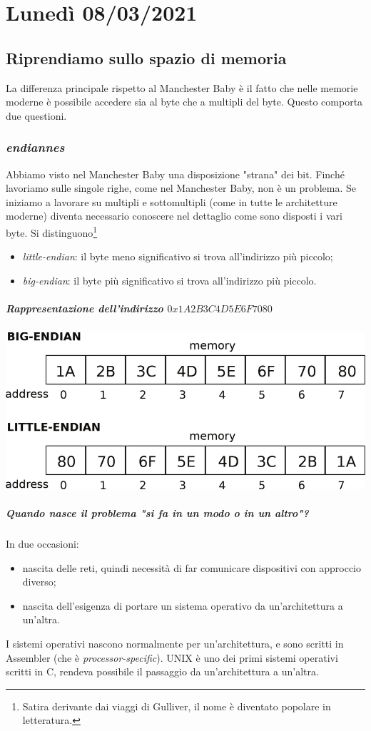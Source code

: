 \documentclass[11pt]{report}
\theoremstyle{definition}
\begin{document}
\chapter{Lunedì 08/03/2021}
\section{Riprendiamo sullo spazio di memoria}
La differenza principale rispetto al Manchester Baby è il fatto che nelle memorie moderne è possibile accedere sia al byte che a multipli del byte. Questo comporta due questioni.
\subsection{\emph{endiannes}}
Abbiamo visto nel Manchester Baby una disposizione "strana" dei bit. Finché lavoriamo sulle singole righe, come nel Manchester Baby, non è un problema. Se iniziamo a lavorare su multipli e sottomultipli (come in tutte le architetture moderne) diventa necessario conoscere nel dettaglio come sono disposti i vari byte. Si distinguono\footnote{Satira derivante dai viaggi di Gulliver, il nome è diventato popolare in letteratura.} 
\begin{itemize}
\item \emph{little-endian}: il byte meno significativo si trova all'indirizzo più piccolo;
\item \emph{big-endian}: il byte più significativo si trova all'indirizzo più piccolo.
\end{itemize}
\paragraph{Rappresentazione dell'indirizzo $0x1A2B3C4D5E6F7080$}
\begin{center}
\includegraphics[scale=0.60]{img/134.PNG}
\end{center}
\paragraph{Quando nasce il problema "si fa in un modo o in un altro"?} In due occasioni:
\begin{itemize} 
\item nascita delle reti, quindi necessità di far comunicare dispositivi con approccio diverso;
\item nascita dell'esigenza di portare un sistema operativo da un'architettura a un'altra.
\end{itemize}
I sistemi operativi nascono normalmente per un'architettura, e sono scritti in Assembler (che è \emph{processor-specific}). UNIX è uno dei primi sistemi operativi scritti in C, rendeva possibile il passaggio da un'architettura a un'altra.  
\end{document}
